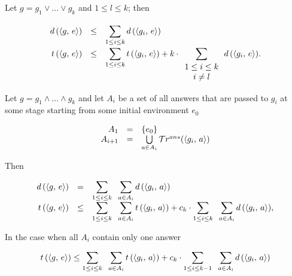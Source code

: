 \begin{lemma}

Let $g = g_1 \lor \dots \lor g_k$ and $1 \le l \le k$; then

\[
\renewcommand{\arraystretch}{1.5}
\begin{array}{rcl}
  d\,(\taskst{g}{e}) &\le& \displaystyle\sum\limits_{1 \le i \le k} d\,(\taskst{g_i}{e}) \\
  t\,(\taskst{g}{e}) &\le& \displaystyle\sum\limits_{1 \le i \le k} t\,(\taskst{g_i}{e}) + k\cdot \displaystyle\sum\limits_{\renewcommand{\arraystretch}{1}\begin{array}{c}1 \le i \le k \\ i \ne l\end{array}} d\,(\taskst{g_i}{e}).
\end{array}
\]

\end{lemma}

\begin{lemma}

Let $g = g_1 \land \dots \land g_k$ and let $A_i$ be a set of all answers that are passed to $g_i$ at some stage starting from some initial environment $e_0$

\[
\begin{array}{rcl}
A_1 &=& \{ e_0 \} \\
A_{i + 1} & = & \bigcup\limits_{a \in A_i} \mathcal{T}r^{ans}(\langle g_i ,\, a \rangle) 
\end{array}
\]

Then

\[
\begin{array}{rcl}
d\,(\langle g ,\, e \rangle) &=& \displaystyle\sum\limits_{1 \le i \le k} \;\; \displaystyle\sum\limits_{a \in A_i} d\,(\langle g_i ,\, a \rangle) \\
t\,(\langle g ,\, e \rangle) &\le& \displaystyle\sum\limits_{1 \le i \le k} \;\; \displaystyle\sum\limits_{a \in A_i} t\,(\langle g_i ,\, a \rangle) + c_k \cdot \displaystyle\sum\limits_{1 \le i \le k} \;\; \displaystyle\sum\limits_{a \in A_i} d\,(\langle g_i ,\, a \rangle), \\
\end{array}
\]

In the case when all $A_i$ contain only one answer

\[
t\,(\langle g ,\, e \rangle) \le \displaystyle\sum\limits_{1 \le i \le k} \;\; \displaystyle\sum\limits_{a \in A_i} t\,(\langle g_i ,\, a \rangle) + c_k \cdot \displaystyle \sum\limits_{1 \le i \le k - 1} \;\; \displaystyle\sum\limits_{a \in A_i} d\,(\langle g_i ,\, a \rangle)
\]

\end{lemma}
